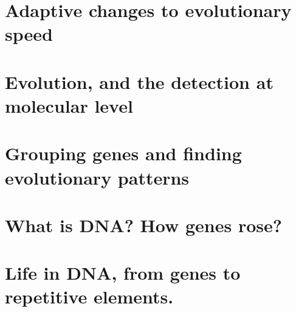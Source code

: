 

\section{Adaptive changes to evolutionary speed}
\section{Evolution, and the detection at molecular level}
\section{Grouping genes and finding evolutionary patterns}
\section{What is DNA? How genes rose?}
\section{Life in DNA, from genes to repetitive elements.}
